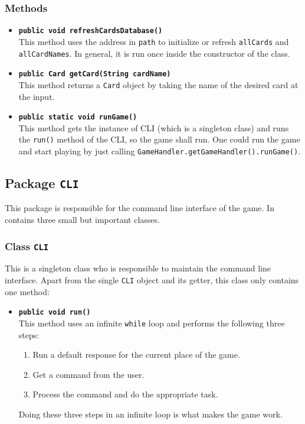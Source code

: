 \documentclass[a4paper]{article}
\begin{document}
\subsubsection{Methods}
\begin{itemize}
	\item \texttt{\textbf{public void refreshCardsDatabase()}}\\
	This method uses the address in \texttt{path} to initialize or refresh \texttt{allCards} and \texttt{allCardNames}. In general, it is run once inside the constructor of the class.
	
	\item \texttt{\textbf{public Card getCard(String cardName)}}\\
	This method returns a \texttt{Card} object by taking the name of the desired card at the input.
	
	\item \texttt{\textbf{public static void runGame()}}\\
	This method gets the instance of CLI (which is a singleton class) and runs the \texttt{run()} method of the CLI, so the game shall run. One could run the game and start playing by just calling \texttt{GameHandler.getGameHandler().runGame()}.
	
\end{itemize}

\subsection{Package \texttt{CLI}}
This package is responsible for the command line interface of the game. In contains three small but important classes.
\subsubsection{Class \texttt{CLI}}
This is a singleton class who is responsible to maintain the command line interface. Apart from the single \texttt{CLI} object and its getter, this class only contains one method:
\begin{itemize}
	\item \texttt{\textbf{public void run()}}\\
	This method uses an infinite \texttt{while} loop and performs the following three steps:
	\begin{enumerate}
		\item Run a default response for the current place of the game.
		\item Get a command from the user.
		\item Process the command and do the appropriate task.
	\end{enumerate}
	Doing these three steps in an infinite loop is what makes the game work.
\end{itemize}
\end{document}
